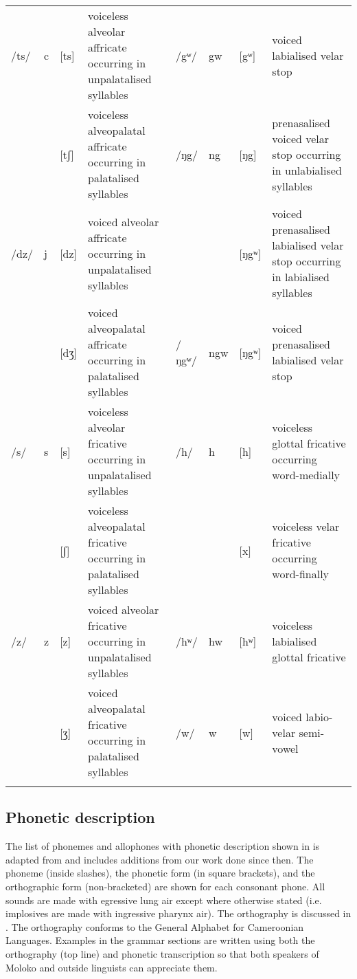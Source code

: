 \begin{table}
{\begin{tabularx}{\textheight}{lllQ@{\hspace{2.5em}}lllQ}
/ts/&   c  & [ts]&     voiceless alveolar affricate occurring in unpalatalised syllables & /gʷ/ & gw & [gʷ]  &  voiced labialised velar stop    \\
	&      & [tʃ] &     voiceless alveopalatal affricate occurring in palatalised syllables &/ŋg/ &   ng & [ŋg] &   prenasalised voiced velar stop occurring in unlabialised syllables\\
/dz/&   j  & [dz] &     voiced alveolar affricate occurring in unpalatalised syllables &     &      & [ŋgʷ] &   voiced prenasalised labialised velar stop occurring in labialised syllables\\
    &      & [dʒ] &     voiced alveopalatal affricate occurring in palatalised syllables\ & /ŋgʷ/  & ngw &  [ŋgʷ] &   voiced prenasalised labialised velar stop\\
/s/ &   s  & [s] &     voiceless alveolar fricative occurring in unpalatalised syllables & /h/ &   h & [h]  &  voiceless glottal fricative occurring word-medially\\
    &      & [ʃ] &     voiceless alveopalatal fricative occurring in palatalised syllables &     &     & [x]  & voiceless velar fricative occurring word-finally  \\
/z/ &   z  & [z] &     voiced alveolar fricative occurring in unpalatalised syllables & /hʷ/ & hw & [hʷ]  &  voiceless labialised glottal fricative    \\    
    &      & [ʒ] &     voiced alveopalatal fricative occurring in palatalised syllables & /w/ &   w & [w]  & voiced labio-velar semi-vowel\\
   \lspbottomrule
\end{tabularx}}
\end{table}

\subsection{Phonetic description}\label{sec:2.2.1}%
\hypertarget{RefHeading1210461525720847}{}
The list of phonemes and allophones with phonetic description shown in  is adapted from \citet{Bow1997c} and includes additions from our work done since then. The phoneme (inside slashes), the phonetic form (in square brackets), and the orthographic form (non-bracketed) are shown for each consonant phone. All sounds are made with egressive lung air except where otherwise stated (i.e. implosives are made with ingressive pharynx air). The orthography is discussed in \citet{Friesen2001}. The orthography conforms to the General Alphabet for Cameroonian Languages. Examples in the grammar sections are written using both the orthography (top line) and phonetic transcription so that both speakers of Moloko and outside linguists can appreciate them. 

